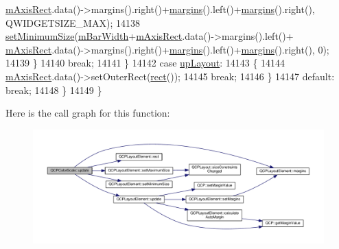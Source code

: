 \begin{DoxyCode}
      \hyperlink{class_q_c_p_color_scale_a6e37f7d49cd614dc50ef1caae60461b9}{mAxisRect}.data()->margins().right()+\hyperlink{class_q_c_p_layout_element_a85ff977dfcced84eef32d9f819ec9543}{margins}().left()+\hyperlink{class_q_c_p_layout_element_a85ff977dfcced84eef32d9f819ec9543}{margins}().right(), 
      QWIDGETSIZE\_MAX);
14138         \hyperlink{class_q_c_p_layout_element_a5dd29a3c8bc88440c97c06b67be7886b}{setMinimumSize}(\hyperlink{class_q_c_p_color_scale_a409d2ab78dff1f92da5e6acfb062e811}{mBarWidth}+\hyperlink{class_q_c_p_color_scale_a6e37f7d49cd614dc50ef1caae60461b9}{mAxisRect}.data()->margins().left()+
      \hyperlink{class_q_c_p_color_scale_a6e37f7d49cd614dc50ef1caae60461b9}{mAxisRect}.data()->margins().right()+\hyperlink{class_q_c_p_layout_element_a85ff977dfcced84eef32d9f819ec9543}{margins}().left()+\hyperlink{class_q_c_p_layout_element_a85ff977dfcced84eef32d9f819ec9543}{margins}().right(), 0);
14139       \}
14140       \textcolor{keywordflow}{break};
14141     \}
14142     \textcolor{keywordflow}{case} \hyperlink{class_q_c_p_layout_element_a0d83360e05735735aaf6d7983c56374da5d1ccf5d79967c232c3c511796860045}{upLayout}:
14143     \{
14144       \hyperlink{class_q_c_p_color_scale_a6e37f7d49cd614dc50ef1caae60461b9}{mAxisRect}.data()->setOuterRect(\hyperlink{class_q_c_p_layout_element_affdfea003469aac3d0fac5f4e06171bc}{rect}());
14145       \textcolor{keywordflow}{break};
14146     \}
14147     \textcolor{keywordflow}{default}: \textcolor{keywordflow}{break};
14148   \}
14149 \}
\end{DoxyCode}


Here is the call graph for this function\+:\nopagebreak
\begin{figure}[H]
\begin{center}
\leavevmode
\includegraphics[width=350pt]{class_q_c_p_color_scale_ab8f6991ac88243fc582b44b183670334_cgraph}
\end{center}
\end{figure}


\hypertarget{class_q_c_p_color_scale_ab398e14c01240f3dc855884fe9e1ee8c}{}
